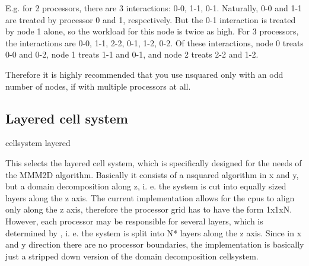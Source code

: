E.g. for 2 processors, there are 3 interactions: 0-0, 1-1, 0-1.
Naturally, 0-0 and 1-1 are treated by processor 0 and 1, respectively.
But the 0-1 interaction is treated by node 1 alone, so the workload
for this node is twice as high. For 3 processors, the interactions are
0-0, 1-1, 2-2, 0-1, 1-2, 0-2. Of these interactions, node 0 treats 0-0
and 0-2, node 1 treats 1-1 and 0-1, and node 2 treats 2-2 and 1-2.

Therefore it is highly recommended that you use nsquared only with an
odd number of nodes, if with multiple processors at all. 

\subsection{Layered cell system}
\begin{essyntax}
  cellsystem layered 
\end{essyntax}

This selects the layered cell system, which is specifically designed
for the needs of the MMM2D algorithm. Basically it consists of a
nsquared algorithm in x and y, but a domain decomposition along z, i.
e. the system is cut into equally sized layers along the z axis. The
current implementation allows for the cpus to align only along the z
axis, therefore the processor grid has to have the form 1x1xN.
However, each processor may be responsible for several layers, which
is determined by , i. e. the system is split into
N* layers along the z axis. Since in x and y direction
there are no processor boundaries, the implementation is basically
just a stripped down version of the domain decomposition cellsystem.

